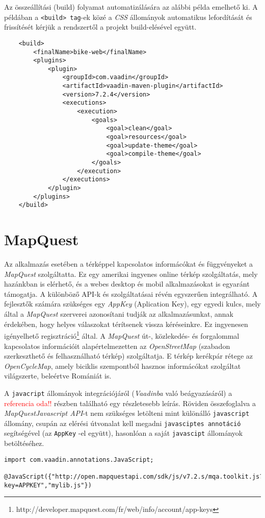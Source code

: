 \par Az összeállítási (build) folyamat automatizálására az alábbi példa emelhető ki. A példában a {\tt <build> tag}-ek közé a \textit{CSS} állományok automatikus lefordítását és frissítését kérjük a rendszertől a projekt build-elésével együtt.
\lstset{language=XML}
\begin{lstlisting}
	<build>
		<finalName>bike-web</finalName>
		<plugins>
			<plugin>
                <groupId>com.vaadin</groupId>
                <artifactId>vaadin-maven-plugin</artifactId>
                <version>7.2.4</version>
                <executions>
                    <execution>
                        <goals>
                            <goal>clean</goal>
                            <goal>resources</goal>
                            <goal>update-theme</goal>
                            <goal>compile-theme</goal>
                        </goals>
                    </execution>
                </executions>
            </plugin>
		</plugins>
	</build>
\end{lstlisting}


%
\section{MapQuest}\label{sec:FELH:mq}

Az alkalmazás esetében a térképpel kapcsolatos informácókat és függvényeket a \textit{MapQuest} szolgáltatta. Ez egy amerikai ingyenes online térkép szolgáltatás, mely hazánkban is elérhető, és a webes desktop és mobil alkalmazásokat is egyaránt támogatja. A különböző API-k és szolgáltatásai révén egyszerűen integrálható. A fejlesztők számára szükséges egy \textit{AppKey} (Aplication Key), egy egyedi kulcs, mely által a \textit{MapQuest} szerverei azonosítani tudják az alkalmazásunkat, annak érdekében, hogy helyes válaszokat térítsenek vissza kéréseinkre. Ez ingyenesen igényelhető regisztráció\footnote{http://developer.mapquest.com/fr/web/info/account/app-keys} által. A \textit{MapQuest}  út-, közlekedés- és forgalommal kapcsolatos információit alapértelmezetten az \textit{OpenStreetMap} (szabadon szerkeszthető és felhasználható térkép) szolgáltatja. E térkép kerékpár rétege az \textit{OpenCycleMap}, amely biciklis szempontból hasznos informácókat szolgáltat világszerte, beleértve Romániát is. 

\par A {\tt javacript} állományok  integrációjáról (\textit{Vaadinba} való beágyazásáról) a \textcolor{red}{referencia oda!!} részben található egy részletesebb leírás.  Röviden összefoglalva a  \textit{MapQuestJavascript API}-t nem szükséges letölteni mint különálló {\tt javascript} állomány, csupán az elérési útvonalat kell megadni  {\tt javasciptes annotáció } segítségével (az {\tt AppKey} -el együtt), hasonlóan a saját {\tt javascipt} állományok betöltéséhez. 
\lstset{language=Java}
\begin{lstlisting}
import com.vaadin.annotations.JavaScript;

@JavaScript({"http://open.mapquestapi.com/sdk/js/v7.2.s/mqa.toolkit.js?key=APPKEY","mylib.js"})

\end{lstlisting}



